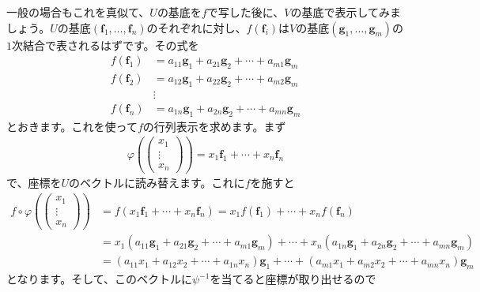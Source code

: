 一般の場合もこれを真似て、$U$の基底を$f$で写した後に、$V$の基底で表示してみましょう。$U$の基底$(\bm{f}_1, \ldots, \bm{f}_n)$のそれぞれに対し、$f(\bm{f}_i)$は$V$の基底$(\bm{g}_1, \ldots, \bm{g}_m)$の$1$次結合で表されるはずです。その式を
\begin{align*}
f(\bm{f}_1) &= a_{11}\bm{g}_1 + a_{21}\bm{g}_2 + \cdots + a_{m1}\bm{g}_m \\
f(\bm{f}_2) &= a_{12}\bm{g}_1 + a_{22}\bm{g}_2 + \cdots + a_{m2}\bm{g}_m \\
&\vdots \\
f(\bm{f}_n) &= a_{1n}\bm{g}_1 + a_{2n}\bm{g}_2 + \cdots + a_{mn}\bm{g}_m
\end{align*}
とおきます。これを使って$f$の行列表示を求めます。まず
\begin{align*}
\varphi
\left(
\begin{pmatrix}
x_1 \\
\vdots \\
x_n
\end{pmatrix}
\right)
= x_1 \bm{f}_1 + \cdots + x_n \bm{f}_n
\end{align*}
で、座標を$U$のベクトルに読み替えます。これに$f$を施すと
\begin{align*}
f\circ \varphi
\left(
\begin{pmatrix}
x_1 \\
\vdots \\
x_n
\end{pmatrix}
\right)
&= f(x_1 \bm{f}_1 + \cdots + x_n \bm{f}_n) = x_1 f(\bm{f}_1) + \cdots + x_n f(\bm{f}_n) \\
&= x_1 (a_{11}\bm{g}_1 + a_{21}\bm{g}_2 + \cdots + a_{m1}\bm{g}_m) + \cdots +
x_n(a_{1n}\bm{g}_1 + a_{2n}\bm{g}_2 + \cdots + a_{mn}\bm{g}_m) \\
&= (a_{11} x_1 + a_{12} x_2 + \cdots + a_{1n} x_n)\bm{g}_1 + \cdots + (a_{m1} x_1 + a_{m2} x_2 + \cdots + a_{mn} x_n)\bm{g}_m
\end{align*}
となります。そして、このベクトルに$\psi^{-1}$を当てると座標が取り出せるので
